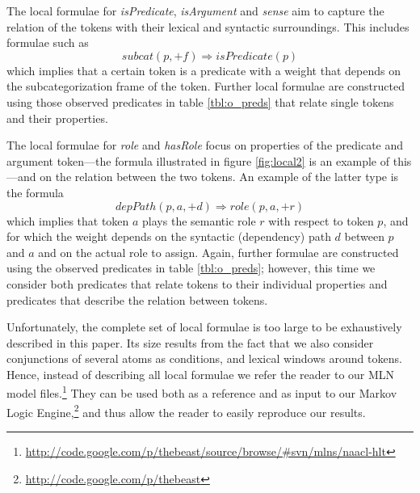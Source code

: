 
The local formulae for \emph{isPredicate}, \emph{isArgument} and \emph{sense} aim to capture the relation of the tokens with their lexical and syntactic surroundings. This includes formulae such as 
\[subcat(p,+f) \Rightarrow isPredicate(p)\]
which implies that a certain token is a predicate with a weight that depends on the subcategorization frame of the token. Further local formulae are constructed using those observed predicates in table \ref{tbl:o_preds} that relate single tokens and their properties.

The local formulae for \emph{role} and \emph{hasRole} focus on properties of the predicate and argument token---the formula illustrated in figure \ref{fig:local2} is an example of this---and on the relation between the two tokens. An example of the latter type is the formula
\[depPath(p,a,+d) \Rightarrow role(p,a,+r)\]
which implies that token $a$ plays the semantic role $r$ with respect to token $p$, and for which the weight depends on the syntactic (dependency) path $d$ between $p$ and $a$ and on the actual role to assign. Again, further formulae are constructed using the observed predicates in table \ref{tbl:o_preds}; however, this time we consider both predicates that relate tokens to their individual properties and predicates that describe the relation between tokens.

Unfortunately, the complete set of local formulae is too large to be exhaustively described in this paper. Its size results from the fact that we also consider conjunctions of several atoms as conditions, and lexical windows around tokens. Hence, instead of describing all local formulae we refer the reader
to our MLN model files.\footnote{\url{http://code.google.com/p/thebeast/source/browse/\#svn/mlns/naacl-hlt}} They can be used both as a reference and as input to our Markov Logic
Engine,\footnote{\url{http://code.google.com/p/thebeast}} and thus allow the reader to easily reproduce our results. 

